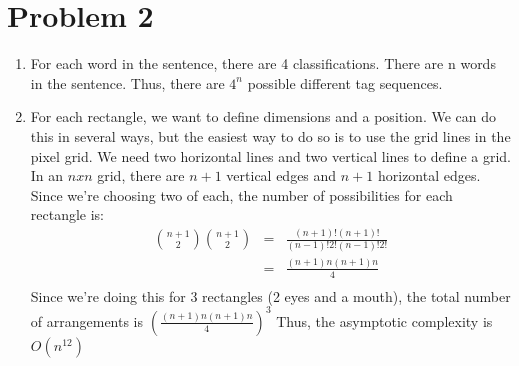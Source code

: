 \documentclass[12pt]{article}
\begin{document}
\section*{Problem 2}

\begin{enumerate}[label=(\alph*)]
  \item For each word in the sentence, there are 4 classifications. There are n words in the sentence. Thus, there are $4^n$ possible different tag sequences.
  
  \item For each rectangle, we want to define dimensions and a position. We can do this in several ways, but the easiest way to do so is to use the grid lines in the pixel grid. We need two horizontal lines and two vertical lines to define a grid. In an $n x n$ grid, there are $n + 1$ vertical edges and $n + 1$ horizontal edges. Since we're choosing two of each, the number of possibilities for each rectangle is:
  \begin{eqnarray*}
  \binom{n+1}{2}\binom{n+1}{2} &=& \frac{(n+1)!(n+1)!}{(n-1)!2!(n-1)!2!}\\
  &=& \frac{(n+1)n(n+1)n}{4}\\
  \end{eqnarray*}
  Since we're doing this for 3 rectangles (2 eyes and a mouth), the total number of arrangements is $(\frac{(n+1)n(n+1)n}{4})^3$
  Thus, the asymptotic complexity is $O(n^{12})$


\end{enumerate}
\end{document}
